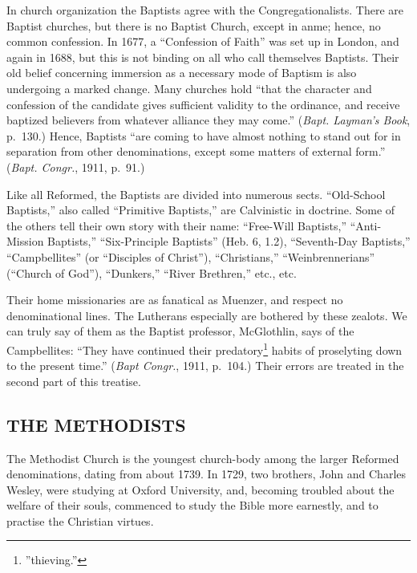 \documentclass[
]{book}
\begin{document}
In church organization the Baptists agree with the Congregationalists. There are Baptist churches, but there is no Baptist Church, except in anme; hence, no common confession. In 1677, a ``Confession of Faith'' was set up in London, and again in 1688, but this is not binding on all who call themselves Baptists. Their old belief concerning immersion as a necessary mode of Baptism is also undergoing a marked change. Many churches hold ``that the character and confession of the candidate gives sufficient validity to the ordinance, and receive baptized believers from whatever alliance they may come.'' (\emph{Bapt. Layman's Book}, p.~130.) Hence, Baptists ``are coming to have almost nothing to stand out for in separation from other denominations, except some matters of external form.'' (\emph{Bapt. Congr.}, 1911, p.~91.)

Like all Reformed, the Baptists are divided into numerous sects. ``Old-School Baptists,'' also called ``Primitive Baptists,'' are Calvinistic in doctrine. Some of the others tell their own story with their name: ``Free-Will Baptists,'' ``Anti-Mission Baptists,'' ``Six-Principle Baptists'' (Heb. 6, 1.2), ``Seventh-Day Baptists,'' ``Campbellites'' (or ``Disciples of Christ''), ``Christians,'' ``Weinbrennerians'' (``Church of God''), ``Dunkers,'' ``River Brethren,'' etc., etc.

Their home missionaries are as fanatical as Muenzer, and respect no denominational lines. The Lutherans especially are bothered by these zealots. We can truly say of them as the Baptist professor, McGlothlin, says of the Campbellites: ``They have continued their predatory\footnote{''thieving.''} habits of proselyting down to the present time.'' (\emph{Bapt Congr.}, 1911, p.~104.) Their errors are treated in the second part of this treatise.

\subsection{\texorpdfstring{THE METHODISTS}{THE METHODISTS}}\label{the-methodists}

The Methodist Church is the youngest church-body among the larger Reformed denominations, dating from about 1739. In 1729, two brothers, John and Charles Wesley, were studying at Oxford University, and, becoming troubled about the welfare of their souls, commenced to study the Bible more earnestly, and to practise the Christian virtues.
\end{document}
